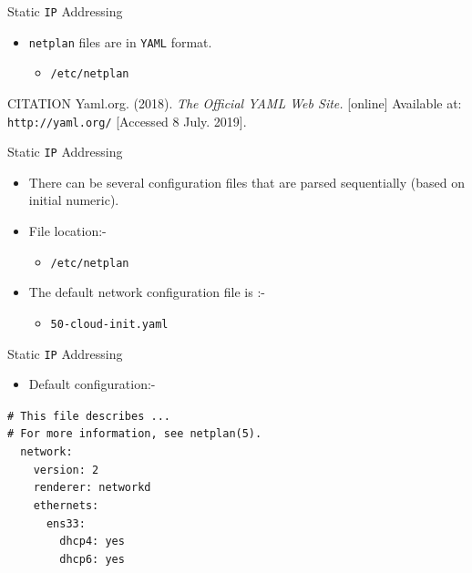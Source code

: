 \documentclass[aspectratio=169]{beamer}
\begin{document}
\begin{frame}{Static \texttt{IP} Addressing}
  \begin{itemize}
    \item \texttt{netplan} files are in \texttt{YAML} format.
    \begin{itemize}
      \item \texttt{/etc/netplan}
    \end{itemize} 
  \end{itemize}
  \begin{block}{CITATION}
    Yaml.org. (2018). \textit{The Official YAML Web Site.} [online] Available at: \texttt{http://yaml.org/} [Accessed 8 July. 2019].
  \end{block}
\end{frame}

\begin{frame}{Static \texttt{IP} Addressing}
  \begin{itemize}
    \item There can be several configuration files that are parsed sequentially (based on initial numeric).
    \item File location:-
    \begin{itemize}
      \item \texttt{/etc/netplan}
    \end{itemize} 
    \item The default network configuration file is :-
    \begin{itemize}
      \item \texttt{50-cloud-init.yaml}
    \end{itemize} 
  \end{itemize}
\end{frame}

\begin{frame}{Static \texttt{IP} Addressing}
  \begin{itemize}
    \item Default configuration:-
  \end{itemize}
    \begin{center}
      \begin{minipage}{8cm}
        \begin{block}{}
          \texttt{\# This file describes ...\\
          \# For more information, see netplan(5).\\
          ~~network:\\
          ~~~~version: 2\\
          ~~~~renderer: networkd\\
          ~~~~ethernets:\\
          ~~~~~~ens33:\\
          ~~~~~~~~dhcp4: yes\\
          ~~~~~~~~dhcp6: yes}
        \end{block}
      \end{minipage}
    \end{center}
\end{frame}
\end{document}
